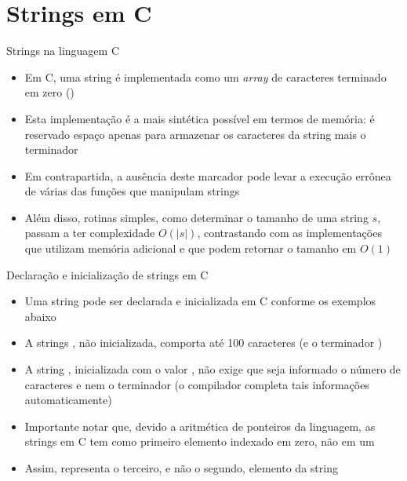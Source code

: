 \section{Strings em C}

\begin{frame}[fragile]{Strings na linguagem C}

    \begin{itemize}
        \item Em C, uma string é implementada como um \textit{array} de caracteres terminado em 
            zero ()
        \pause

        \item Esta implementação é a mais sintética possível em termos de memória: é reservado 
            espaço apenas para armazenar os caracteres da string mais o terminador 
        \pause

        \item Em contrapartida, a ausência deste marcador pode levar a execução errônea de várias 
            das funções que manipulam strings
        \pause

        \item Além disso, rotinas simples, como determinar o tamanho de uma string $s$, passam a ter complexidade $O(|s|)$, contrastando com as implementações que utilizam memória adicional e que podem retornar o tamanho em $O(1)$
    \end{itemize}

\end{frame}

\begin{frame}[fragile]{Declaração e inicialização de strings em C}

    \begin{itemize}
        \item Uma string pode ser declarada e inicializada em C conforme os exemplos abaixo
        \pause

        \item A strings , não inicializada, comporta até 100 caracteres
            (e o terminador )
        \pause

        \item A string , inicializada com o valor , não exige que 
            seja informado o número de caracteres e nem o terminador (o compilador completa tais informações automaticamente)
        \pause

        \item Importante notar que, devido a aritmética de ponteiros da linguagem, as strings em 
            C tem como primeiro elemento indexado em zero, não em um
        \pause

        \item Assim,  representa o terceiro, e não o segundo, elemento da string

    \end{itemize}

\end{frame}

